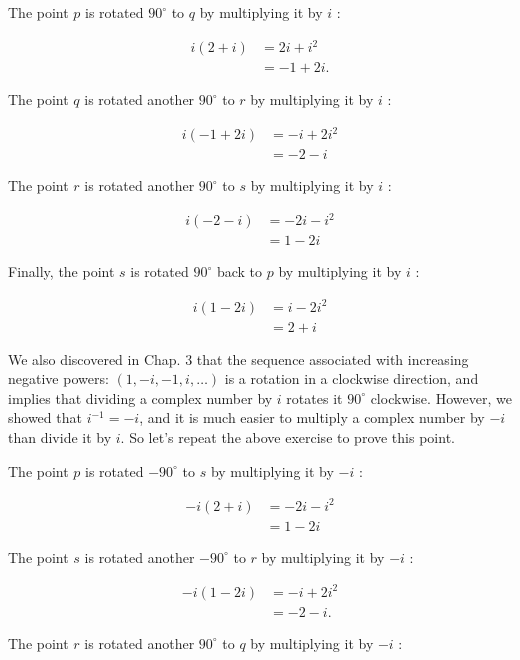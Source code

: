 \documentclass[10pt]{article}
\begin{document}
The point $p$ is rotated $90^{\circ}$ to $q$ by multiplying it by $i$ :

$$
\begin{aligned}
i(2+i) & =2 i+i^{2} \\
& =-1+2 i .
\end{aligned}
$$

The point $q$ is rotated another $90^{\circ}$ to $r$ by multiplying it by $i$ :

$$
\begin{aligned}
i(-1+2 i) & =-i+2 i^{2} \\
& =-2-i
\end{aligned}
$$

The point $r$ is rotated another $90^{\circ}$ to $s$ by multiplying it by $i$ :

$$
\begin{aligned}
i(-2-i) & =-2 i-i^{2} \\
& =1-2 i
\end{aligned}
$$

Finally, the point $s$ is rotated $90^{\circ}$ back to $p$ by multiplying it by $i$ :

$$
\begin{aligned}
i(1-2 i) & =i-2 i^{2} \\
& =2+i
\end{aligned}
$$

We also discovered in Chap. 3 that the sequence associated with increasing negative powers: $(1,-i,-1, i, \ldots)$ is a rotation in a clockwise direction, and implies that dividing a complex number by $i$ rotates it $90^{\circ}$ clockwise. However, we showed that $i^{-1}=-i$, and it is much easier to multiply a complex number by $-i$ than divide it by $i$. So let's repeat the above exercise to prove this point.

The point $p$ is rotated $-90^{\circ}$ to $s$ by multiplying it by $-i$ :

$$
\begin{aligned}
-i(2+i) & =-2 i-i^{2} \\
& =1-2 i
\end{aligned}
$$

The point $s$ is rotated another $-90^{\circ}$ to $r$ by multiplying it by $-i$ :

$$
\begin{aligned}
-i(1-2 i) & =-i+2 i^{2} \\
& =-2-i .
\end{aligned}
$$

The point $r$ is rotated another $90^{\circ}$ to $q$ by multiplying it by $-i$ :
\end{document}
